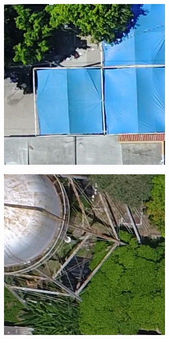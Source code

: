 \begin{figure}[!ht]
  \centering
    \begin{subfigure}{.24\textwidth}
        \includegraphics[width=\textwidth]{images/nondamaged1.jpg}
    \end{subfigure}
    \begin{subfigure}{.24\textwidth}
        \includegraphics[width=\textwidth]{images/nondamaged2.jpg}

\end{subfigure}
\end{figure}
